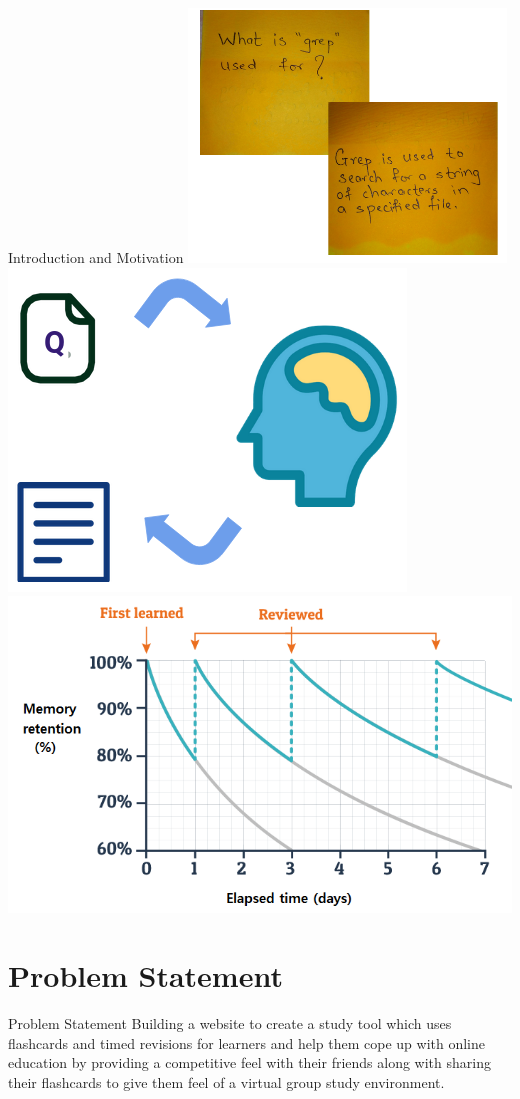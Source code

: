 \documentclass[10pt]{beamer}
\begin{document}
\begin{frame}{Introduction and Motivation}
   \includegraphics[scale=0.385]{Flashcard.png}
   \includegraphics[scale=0.292]{Active_recall.png}
   \centering\includegraphics[scale=0.22]{forgetting_curve.png}\tiny{\cite{forgetting-curve}}
\end{frame}
\section{Problem Statement}
\begin{frame}{Problem Statement}
Building a website to create a study tool which uses flashcards and timed revisions for learners and help them cope up with online education by providing a competitive feel with their friends along with sharing their flashcards to give them feel of a virtual group study environment.\\

\end{frame}
\end{document}
